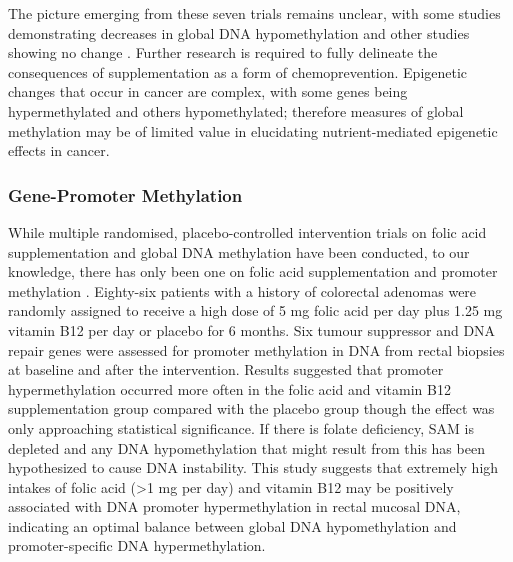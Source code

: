 \noindent The picture emerging from these seven trials remains unclear, with some studies demonstrating decreases in global DNA hypomethylation \cite{c254,c256} and other studies showing no change \cite{c251,c252,c257}. Further research is required to fully delineate the consequences of supplementation as a form of chemoprevention. Epigenetic changes that occur in cancer are complex, with some genes being hypermethylated and others hypomethylated; therefore measures of global methylation may be of limited value in elucidating nutrient-mediated epigenetic effects in cancer. 
 
\subsubsection{Gene-Promoter Methylation} %
\noindent While multiple randomised, placebo-controlled intervention trials on folic acid supplementation and global DNA methylation have been conducted, to our knowledge, there has only been one on folic acid supplementation and promoter methylation \cite{c258}. Eighty-six patients with a history of colorectal adenomas were randomly assigned to receive a high dose of 5 mg folic acid per day plus 1.25 mg vitamin B12 per day or placebo for 6 months. Six tumour suppressor and DNA repair genes were assessed for promoter methylation in DNA from rectal biopsies at baseline and after the intervention. Results suggested that promoter hypermethylation occurred more often in the folic acid and vitamin B12 supplementation group compared with the placebo group though the effect was only approaching statistical significance. If there is folate deficiency, SAM is depleted and any DNA hypomethylation that might result from this has been hypothesized to cause DNA instability. This study suggests that extremely high intakes 
of folic acid (>1 mg per day) and vitamin B12 may be positively associated with DNA promoter hypermethylation in rectal mucosal DNA, indicating an optimal balance between global DNA hypomethylation and promoter-specific DNA hypermethylation. 
 
